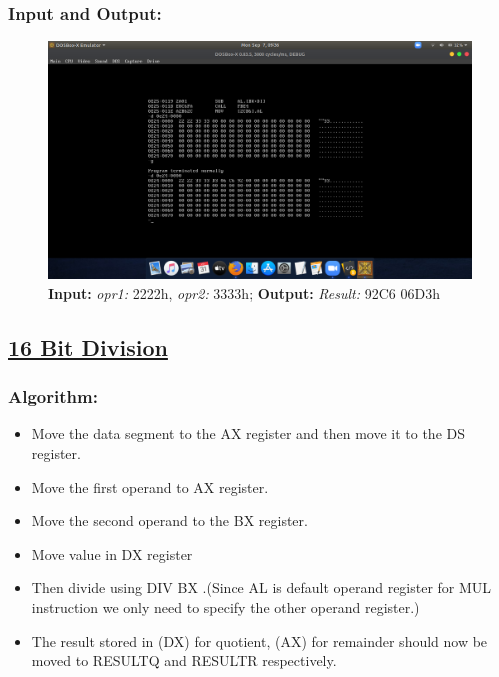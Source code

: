 \documentclass[12pt,a4paper]{article}
\begin{document}
\begin{flushleft}
\subsubsection*{\textbf{Input and Output:}}
\begin{figure}[h]
    \centering
    \includegraphics[trim = 100mm 60mm 100mm 80mm, clip, width = \textwidth]{Pics/MultiplicationIO.png}
    \caption{ \textbf{Input:} \emph{opr1:} 2222h, \emph{opr2:} 3333h; 
              \textbf{Output:} \emph{Result:} 92C6 06D3h}
\end{figure}
\newpage
\subsection*{\textbf{\underline{16 Bit Division}}}

\subsubsection*{\textbf{Algorithm:}}
\begin{itemize}
    \item Move the data segment to the AX register and then move it to the DS register.
    \item Move the first operand to AX register.
    \item  Move the second operand to the BX register.
    \item Move value in DX register
    \item  Then divide using DIV BX .(Since AL is default operand register for MUL instruction we only need to specify the other operand register.)
    \item  The result stored in (DX) for quotient, (AX) for remainder should now be moved to RESULTQ and RESULTR respectively.
\end{itemize}


\end{flushleft}
\end{document}

